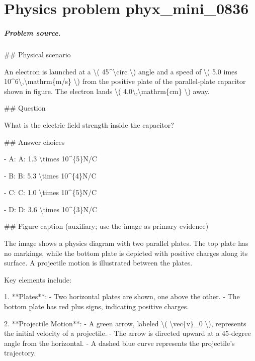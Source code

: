 
\chapter{Physics problem phyx\_mini\_0836}
\label{ch:PhyXMiniProblems_problem_phyx_mini_0836}

\paragraph{Problem source.}
\#\# Physical scenario

An electron is launched at a \textbackslash{}( 45\textasciicircum{}\textbackslash{}circ \textbackslash{}) angle and a speed of \textbackslash{}( 5.0 	imes 10\textasciicircum{}6\textbackslash{},\textbackslash{}mathrm\{m/s\} \textbackslash{}) from the positive plate of the parallel-plate capacitor shown in figure. The electron lands \textbackslash{}( 4.0\textbackslash{},\textbackslash{}mathrm\{cm\} \textbackslash{}) away.

\#\# Question

What is the electric field strength inside the capacitor?

\#\# Answer choices

- A: A: 1.3 \textbackslash{}times 10\textasciicircum{}\{5\}N/C

- B: B: 5.3 \textbackslash{}times 10\textasciicircum{}\{4\}N/C

- C: C: 1.0 \textbackslash{}times 10\textasciicircum{}\{5\}N/C

- D: D: 3.6 \textbackslash{}times 10\textasciicircum{}\{3\}N/C

\#\# Figure caption (auxiliary; use the image as primary evidence)

The image shows a physics diagram with two parallel plates. The top plate has no markings, while the bottom plate is depicted with positive charges along its surface. A projectile motion is illustrated between the plates.

Key elements include:

1. **Plates**: 
   - Two horizontal plates are shown, one above the other. 
   - The bottom plate has red plus signs, indicating positive charges.

2. **Projectile Motion**:
   - A green arrow, labeled \textbackslash{}( \textbackslash{}vec\{v\}\_0 \textbackslash{}), represents the initial velocity of a projectile.
   - The arrow is directed upward at a 45-degree angle from the horizontal.
   - A dashed blue curve represents the projectile's trajectory.


